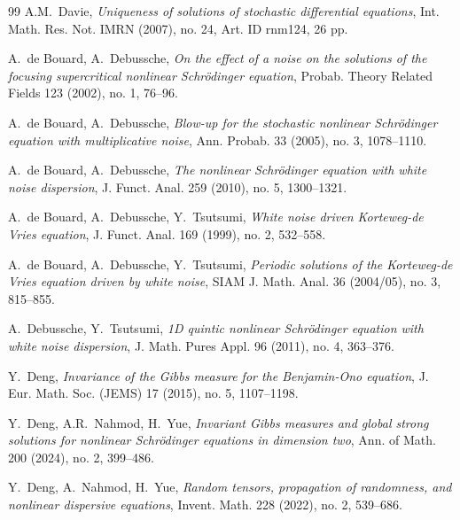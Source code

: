 \documentclass[letterpaper, 11pt,  reqno]{amsart}
\newcommand{\1}{\hspace{0.5mm}\text{I}\hspace{0.5mm}}
\numberwithin{equation}{section}
\numberwithin{theorem}{section}
\begin{document}
\begin{thebibliography}{99}
%
A.M.~Davie,
{\it Uniqueness of solutions of stochastic differential equations},
Int. Math. Res. Not. IMRN (2007), no. 24, Art. ID rnm124, 26 pp.






A.~de Bouard, A.~Debussche, 
{\it On the effect of a noise on the solutions of the focusing supercritical nonlinear Schr\"odinger equation},
Probab. Theory Related Fields 123 (2002), no. 1, 76--96.



A.~de Bouard, A.~Debussche, 
{\it Blow-up for the stochastic nonlinear Schr\"odinger equation with multiplicative noise},
Ann. Probab. 33 (2005), no. 3, 1078--1110.



A.~de Bouard, A.~Debussche, 
{\it The nonlinear Schr\"odinger equation with white noise dispersion},
J. Funct. Anal. 259 (2010), no. 5, 1300--1321. 



A.~de Bouard, A.~Debussche, Y.~Tsutsumi,
{\it White noise driven Korteweg-de Vries equation}, 
J. Funct. Anal. 169 (1999), no. 2, 532--558.


A.~de Bouard, A.~Debussche, Y.~Tsutsumi,
{\it Periodic solutions of the Korteweg-de Vries equation driven by white noise},
 SIAM J. Math. Anal. 36 (2004/05), no. 3, 815--855.
 
 
 
 

A.~Debussche, Y.~Tsutsumi, 
{\it 1D quintic nonlinear Schr\"odinger equation with white noise dispersion},
 J. Math. Pures Appl.  96 (2011), no. 4, 363--376. 


Y.~Deng,
{\it Invariance of the Gibbs measure for the Benjamin-Ono equation}, 
J. Eur. Math. Soc. (JEMS) 17 (2015), no. 5, 1107--1198.



Y.~Deng, A.R.~Nahmod, H.~Yue,
{\it Invariant Gibbs measures and global strong solutions for nonlinear Schr\"odinger equations in dimension two},
Ann. of Math.  200 (2024), no. 2, 399--486.

 

Y.~Deng, A.~Nahmod,  H.~Yue,
{\it Random tensors, propagation of randomness, and
nonlinear dispersive equations}, 
Invent.
Math. 228 (2022), no. 2, 539--686.
 

\end{thebibliography}
\end{document}
